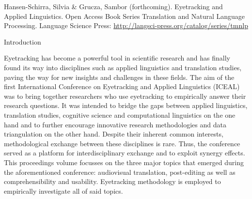 \clearpage\setcounter{page}{1}\begin{styleStandard}
Hansen-Schirra, Silvia \& Grucza, Sambor (forthcoming). Eyetracking and Applied Linguistics. Open Access Book Series {\textquotedbl}Translation and Natural Language Processing{\textquotedbl}. Language Science Press: \url{http://langsci-press.org/catalog/series/tmnlp}
\end{styleStandard}


\begin{styleHeadingi}
Introduction
\end{styleHeadingi}

\begin{styleTextbody}
Eyetracking has become a powerful tool in scientific research and has finally found its way into disciplines such as applied linguistics and translation studies, paving the way for new insights and challenges in these fields. The aim of the first International Conference on Eyetracking and Applied Linguistics (ICEAL) was to bring together researchers who use eyetracking to empirically answer their research questions. It was intended to bridge the gaps between applied linguistics, translation studies, cognitive science and computational linguistics on the one hand and to further encourage innovative research methodologies and data triangulation on the other hand. Despite their inherent common interests, methodological exchange between these disciplines is rare. Thus, the conference served as a platform for interdisciplinary exchange and to exploit synergy effects. This proceedings volume focusses on the three major topics that emerged during the aforementioned conference: audiovisual translation, post-editing as well as comprehensibility and usability. Eyetracking methodology is employed to empirically investigate all of said topics. 
\end{styleTextbody}

